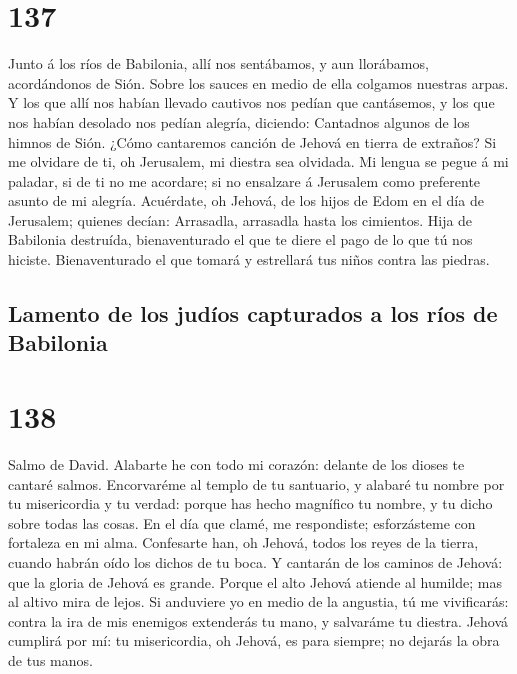 \hypertarget{section-136}{%
\section{137}\label{section-136}}

 Junto á los ríos de Babilonia, allí nos sentábamos, y aun
llorábamos, acordándonos de Sión.  Sobre los sauces en
medio de ella colgamos nuestras arpas.  Y los que allí nos
habían llevado cautivos nos pedían que cantásemos, y los que nos habían
desolado nos pedían alegría, diciendo:  Cantadnos algunos
de los himnos de Sión. ¿Cómo cantaremos canción de Jehová en tierra de
extraños?  Si me olvidare de ti, oh Jerusalem, mi diestra
sea olvidada.  Mi lengua se pegue á mi paladar, si de ti
no me acordare; si no ensalzare á Jerusalem como preferente asunto de mi
alegría.  Acuérdate, oh Jehová, de los hijos de Edom en el
día de Jerusalem; quienes decían: Arrasadla, arrasadla hasta los
cimientos.  Hija de Babilonia destruída, bienaventurado el
que te diere el pago de lo que tú nos hiciste. 
Bienaventurado el que tomará y estrellará tus niños contra las piedras.

\hypertarget{lamento-de-los-juduxedos-capturados-a-los-ruxedos-de-babilonia-1}{%
\subsection{Lamento de los judíos capturados a los ríos de
Babilonia}\label{lamento-de-los-juduxedos-capturados-a-los-ruxedos-de-babilonia-1}}

\hypertarget{section-137}{%
\section{138}\label{section-137}}

 Salmo de David. Alabarte he con todo mi corazón: delante
de los dioses te cantaré salmos.  Encorvaréme al templo de
tu santuario, y alabaré tu nombre por tu misericordia y tu verdad:
porque has hecho magnífico tu nombre, y tu dicho sobre todas las cosas.
 En el día que clamé, me respondiste; esforzásteme con
fortaleza en mi alma.  Confesarte han, oh Jehová, todos
los reyes de la tierra, cuando habrán oído los dichos de tu boca.
 Y cantarán de los caminos de Jehová: que la gloria de
Jehová es grande.  Porque el alto Jehová atiende al
humilde; mas al altivo mira de lejos.  Si anduviere yo en
medio de la angustia, tú me vivificarás: contra la ira de mis enemigos
extenderás tu mano, y salvaráme tu diestra.  Jehová
cumplirá por mí: tu misericordia, oh Jehová, es para siempre; no dejarás
la obra de tus manos.

